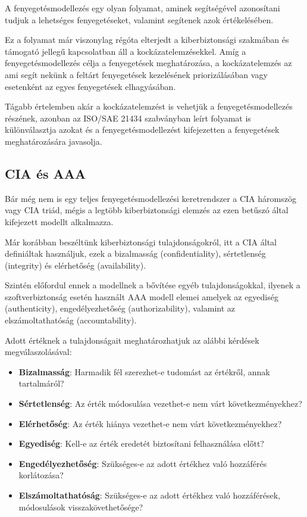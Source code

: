 A fenyegetésmodellezés egy olyan folyamat, aminek segítségével azonosítani tudjuk a lehetséges fenyegetéseket, valamint segítenek azok értékelésében.

Ez a folyamat már viszonylag régóta elterjedt a kiberbiztonsági szakmában és támogató jellegű kapcsolatban áll a kockázatelemzésekkel. Amíg a fenyegetésmodellezés célja a fenyegetések meghatározása, a kockázatelemzés az ami segít nekünk a feltárt fenyegetések kezelésének priorizálásában vagy esetenként az egyes fenyegetések elhagyásában.

Tágabb értelemben akár a kockázatelemzést is vehetjük a fenyegetésmodellezés részének, azonban az ISO/SAE 21434 szabványban leírt folyamat is különválasztja azokat és a fenyegetésmodellezést kifejezetten a fenyegetések meghatározására javasolja.

\subsection{CIA és AAA}

Bár még nem is egy teljes fenyegetésmodellezési keretrendszer a CIA háromszög vagy CIA triád, mégis a legtöbb kiberbiztonsági elemzés az ezen betűszó által kifejezett modellt alkalmazza.

Már korábban beszéltünk kiberbiztonsági tulajdonságokról, itt a CIA által definiáltak használjuk, ezek a bizalmasság (confidentiality), sértetlenség (integrity) és elérhetőség (availability). 

Szintén előfordul ennek a modellnek a bővítése egyéb tulajdonságokkal, ilyenek a szoftverbiztonság esetén használt AAA modell elemei amelyek az egyediség (authenticity), engedélyezhetőség (authorizability), valamint az elszámoltathatóság (accountability).

Adott értéknek a tulajdonságait meghatározhatjuk az alábbi kérdések megválaszolásával:
\begin{itemize}
    \item \textbf{Bizalmasság}: Harmadik fél szerezhet-e tudomást az értékről, annak tartalmáról?
    \item \textbf{Sértetlenség}: Az érték módosulása vezethet-e nem várt következményekhez?
    \item \textbf{Elérhetőség}: Az érték hiánya vezethet-e nem várt következményekhez?
    \item \textbf{Egyediség}: Kell-e az érték eredetét biztosítani felhasználása előtt?
    \item \textbf{Engedélyezhetőség}: Szükséges-e az adott értékhez való hozzáférés korlátozása?
    \item \textbf{Elszámoltathatóság}: Szükséges-e az adott értékhez való hozzáférések, módosulások visszakövethetősége?
\end{itemize}

